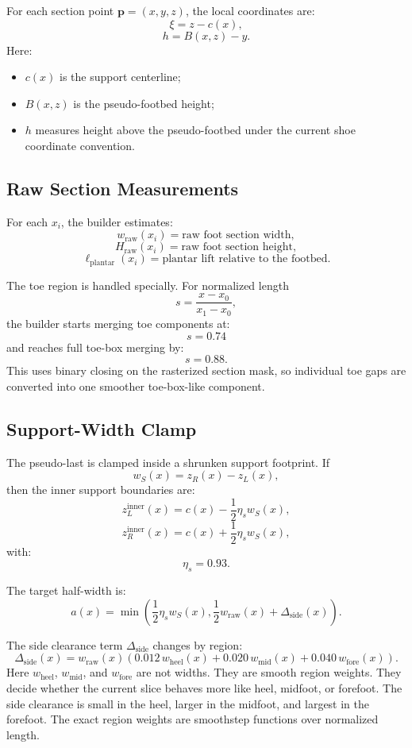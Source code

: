 \documentclass[11pt]{article}
\newcommand{\pt}{\mathbf{p}}
\begin{document}
For each section point \(\pt=(x,y,z)\), the local coordinates are:
\[
\xi = z-c(x),
\]
\[
h = B(x,z)-y.
\]
Here:
\begin{itemize}
    \item \(c(x)\) is the support centerline;
    \item \(B(x,z)\) is the pseudo-footbed height;
    \item \(h\) measures height above the pseudo-footbed under the current shoe
    coordinate convention.
\end{itemize}

\subsection{Raw Section Measurements}

For each \(x_i\), the builder estimates:
\[
w_{\text{raw}}(x_i) = \text{raw foot section width},
\]
\[
H_{\text{raw}}(x_i) = \text{raw foot section height},
\]
\[
\ell_{\text{plantar}}(x_i) = \text{plantar lift relative to the footbed}.
\]

The toe region is handled specially.  For normalized length
\[
s=\frac{x-x_0}{x_1-x_0},
\]
the builder starts merging toe components at:
\[
s=0.74
\]
and reaches full toe-box merging by:
\[
s=0.88.
\]
This uses binary closing on the rasterized section mask, so individual toe gaps
are converted into one smoother toe-box-like component.

\subsection{Support-Width Clamp}

The pseudo-last is clamped inside a shrunken support footprint.  If
\[
w_S(x)=z_R(x)-z_L(x),
\]
then the inner support boundaries are:
\[
z_L^{\text{inner}}(x)=c(x)-\frac{1}{2}\eta_s w_S(x),
\]
\[
z_R^{\text{inner}}(x)=c(x)+\frac{1}{2}\eta_s w_S(x),
\]
with:
\[
\eta_s=0.93.
\]

The target half-width is:
\[
a(x)=
\min\left(
\frac{1}{2}\eta_s w_S(x),
\frac{1}{2}w_{\text{raw}}(x)+\Delta_{\text{side}}(x)
\right).
\]

The side clearance term \(\Delta_{\text{side}}\) changes by region:
\[
\Delta_{\text{side}}(x)
=w_{\text{raw}}(x)
\left(
0.012\,w_{\text{heel}}(x)
+0.020\,w_{\text{mid}}(x)
+0.040\,w_{\text{fore}}(x)
\right).
\]
Here \(w_{\text{heel}}\), \(w_{\text{mid}}\), and \(w_{\text{fore}}\) are not
widths.  They are smooth region weights.  They decide whether the current slice
behaves more like heel, midfoot, or forefoot.  The side clearance is small in
the heel, larger in the midfoot, and largest in the forefoot.  The exact region
weights are smoothstep functions over normalized length.
\end{document}
